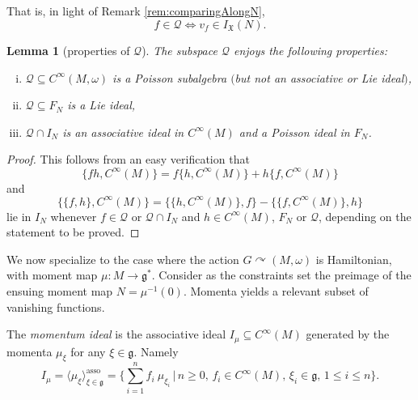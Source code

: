 \documentclass[10pt,a4paper]{amsart}
\numberwithin{equation}{section}
\newtheorem{Lemma}[Theorem]{Lemma}
\DeclareMathOperator{\action}{\curvearrowright}
\newcommand{\g}{\mathfrak{g}}
\newcommand{\X}{\mathfrak{X}}
\renewcommand{\subset}{\subseteq}
\begin{document}
That is, in light of Remark \ref{rem:comparingAlongN},
\[
	f \in \mathcal{Q} \iff v_f\in I_\X(N).
\]

\begin{Lemma}[properties of $\mathcal{Q}$]\label{lem:Qproperties}
	The subspace $\mathcal{Q}$ enjoys the following properties:
	\begin{enumerate}[i.]\itemsep=0pt
		\item[$(i)$] $\mathcal{Q}\subset C^\infty(M,\omega)$ is a Poisson subalgebra $($but not an associative or Lie ideal$)$,
		\item[$(ii)$] $\mathcal{Q}\subset F_N$ is a Lie ideal,
		\item[$(iii)$] $\mathcal{Q}\cap I_N$ is an associative ideal in $C^\infty(M)$ and a Poisson ideal in $F_N$.		
	\end{enumerate}
\end{Lemma}

\begin{proof}
	This follows from an easy verification that
	\[
		\{fh,C^\infty(M)\} = f\{h,C^\infty(M)\} + h\{f,C^\infty(M)\}
	\]
	and
	\[
		\{\{f,h\},C^\infty(M)\} = \{\{h,C^\infty(M)\},f\}- \{\{f,C^\infty(M)\},h\}
	\]
	lie in $I_N$ whenever $f\in\mathcal{Q}$ or $\mathcal{Q}\cap I_N$ and $h\in C^\infty(M)$, $F_N$ or $\mathcal{Q}$, depending on the statement to be proved.
\end{proof}

We now specialize to the case where the action $G\action (M,\omega)$ is Hamiltonian, with moment map $\mu\colon M\to \g^*$.  Consider as the constraints set the preimage of the ensuing moment map $N=\mu^{-1}(0)$.
Momenta yields a relevant subset of vanishing functions.

\begin{Definition}\label{def:momentumideal}
	The \emph{momentum ideal} is the associative ideal $I_\mu\subset C^\infty(M)$ generated by the momenta $\mu_{\xi}$ for any $\xi\in \mathfrak{g}$.
	Namely
	\[
		I_\mu
		=
		\langle \mu_\xi \rangle_{\xi \in \mathfrak{g}}^{\text{asso}}
		=
		\Biggl\{
				\sum_{i=1}^n f_i ~ \mu_{\xi_i}
			\,\Bigg|\,
				n\geq0,\, f_i \in C^\infty(M),\, \xi_i\in \mathfrak{g},\,  1 \leq i \leq n
		\Biggr\}
		.
	\]
\end{Definition}
\end{document}

